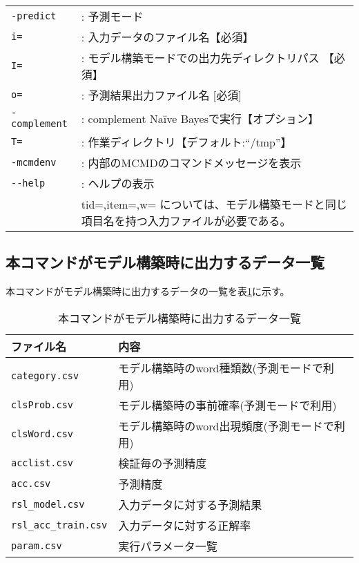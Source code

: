 \begin{table}[htbp]
{\small
\begin{tabular}{ll}

\verb|-predict|    &: 予測モード \\
\verb|i=|          &: 入力データのファイル名【必須】\\
\verb|I=|          &: モデル構築モードでの出力先ディレクトリパス 【必須】 \\
\verb|o=|          &: 予測結果出力ファイル名 [必須] \\
\verb|-complement| &: complement Na{\"i}ve Bayesで実行【オプション】\\
\verb|T=|          &: 作業ディレクトリ【デフォルト:``/tmp''】\\
\verb|-mcmdenv|    &: 内部のMCMDのコマンドメッセージを表示\\
\verb|--help|      &: ヘルプの表示 \\
&tid=,item=,w= については、モデル構築モードと同じ項目名を持つ入力ファイルが必要である。\\
\end{tabular} 
}
\end{table} 

\subsection{本コマンドがモデル構築時に出力するデータ一覧}
本コマンドがモデル構築時に出力するデータの一覧を表\ref{tbl:rslfile}に示す。


\begin{table}[h]
\begin{center}
{\small
\begin{tabular}{ll}
\hline
ファイル名&内容\\
\hline
\verb|category.csv|      & モデル構築時のword種類数(予測モードで利用) \\
\verb|clsProb.csv|       & モデル構築時の事前確率(予測モードで利用) \\
\verb|clsWord.csv|       & モデル構築時のword出現頻度(予測モードで利用) \\
\verb|acclist.csv|       & 検証毎の予測精度 \\
\verb|acc.csv|           & 予測精度 \\
\verb|rsl_model.csv|     & 入力データに対する予測結果 \\
\verb|rsl_acc_train.csv| & 入力データに対する正解率 \\
\verb|param.csv|         & 実行パラメータ一覧 \\
\hline
\end{tabular}
}

\caption{本コマンドがモデル構築時に出力するデータ一覧}
\label{tbl:rslfile}

\end{center}
\end{table}

